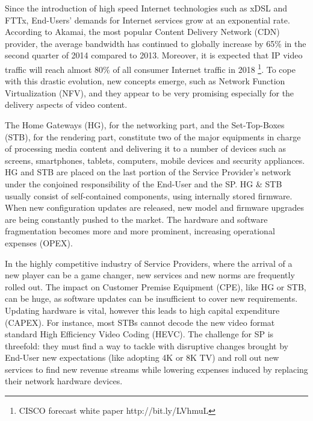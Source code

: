 Since the introduction of high speed Internet technologies such as xDSL and FTTx, End-Users' demands for Internet services grow at an exponential rate.
According to Akamai, the most popular Content Delivery Network (CDN) provider, the average bandwidth has continued to globally increase by 65\% in the second quarter of 2014 \cite{_akamais_2014} compared to 2013. 
Moreover, it is expected that IP video traffic will reach almost 80\% of all consumer Internet traffic in 2018 \footnote{CISCO forecast white paper http://bit.ly/LVhmuL }. To cope with this drastic evolution, new concepts emerge, such as Network Function Virtualization (NFV), and they appear to be very promising especially for the delivery aspects of video content.

The Home Gateways (HG), for the networking part, and the Set-Top-Boxes (STB), for the rendering part, constitute two of the major equipments in charge of processing media content and delivering it to a number of devices such as screens, smartphones, tablets, computers, mobile devices and security appliances.
HG and STB are placed on the last portion of the Service Provider's network under the conjoined responsibility of the End-User and the SP.
HG \& STB usually consist of self-contained components, using internally stored firmware.
When new configuration updates are released, new model and firmware upgrades are being constantly pushed to the market.
The hardware and software fragmentation becomes more and more prominent, increasing operational expenses (OPEX). 

In the highly competitive industry of Service Providers, where the arrival of a new player can be a game changer, new services and new norms are frequently rolled out.	
The impact on Customer Premise Equipment (CPE), like HG or STB, can be huge, as software updates can be insufficient to cover new requirements.
Updating hardware is vital, however this leads to high capital expenditure (CAPEX).
For instance, most STBs cannot decode the new video format standard  High Efficiency Video Coding (HEVC). 
The challenge for SP is threefold: they must find a way to tackle with disruptive changes brought by End-User new expectations (like adopting 4K or 8K TV) and roll out new services to find new revenue streams while lowering expenses induced by replacing their network hardware devices.

